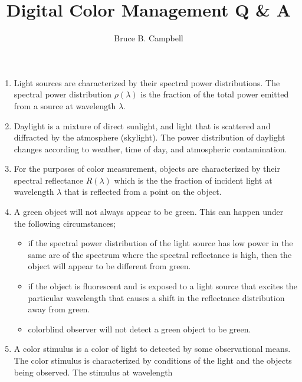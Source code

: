 \documentclass{amsart}
\theoremstyle{definition}
\theoremstyle{remark}
\numberwithin{equation}{section}
\begin{document}
\title{ Digital Color Management Q \& A }

\author{Bruce B. Campbell}

\address{}





\maketitle


\begin{enumerate}
\item Light sources are characterized by their spectral power
distributions.  The spectral power distribution $\rho(\lambda)$ is
the fraction of the total power emitted from a source at
wavelength $\lambda$. \item Daylight is a mixture of direct
sunlight, and light that is scattered and diffracted by the
atmosphere (skylight).  The power distribution of daylight changes
according to weather, time of day, and atmospheric contamination.
\item For the purposes of color measurement, objects are
characterized by their spectral reflectance $R(\lambda)$ which is
the the fraction of incident light at wavelength $\lambda$ that is
reflected from a point on the object. \item A green object will
not always appear to be green.  This can happen under the
following circumstances;
\begin{itemize} \item if the spectral power distribution
of the light source has low power in the same are of the spectrum
where the spectral reflectance is high, then the object will
appear to be different from green. \item if the object is
fluorescent and is exposed to a light source that excites the
particular wavelength that causes a shift in the reflectance
distribution away from green.  \item colorblind observer will not
detect a green object to be green.\end{itemize} \item A color
stimulus is a color of light to detected by some observational
means.  The color stimulus is characterized by conditions of the
light and the objects being observed.  The stimulus at wavelength

\end{enumerate}
\end{document}
